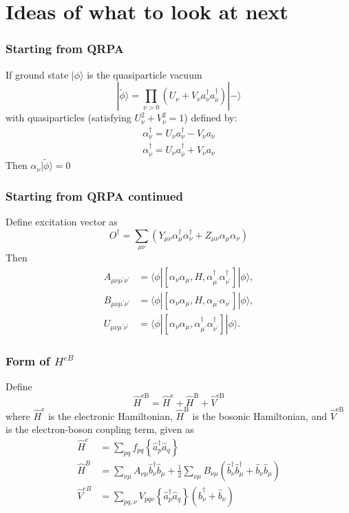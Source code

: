 \documentclass{beamer}
\begin{document}
\section{Ideas of what to look at next}
\begin{frame}
\frametitle{Starting from QRPA}
If ground state $|\phi\rangle$ is the quasiparticle vacuum 
\begin{equation}
|\tilde{\phi}\rangle=\prod_{\nu>0}\left(U_\nu+V_\nu a_\nu^{\dagger} a_{\overline{\nu}}^{\dagger}\right)|-\rangle
\end{equation}
with quasiparticles (satisfying $U_\nu^2+V_\nu^2=1$) defined by: 
\begin{align}
    \alpha_\nu^{\dagger}=U_\nu a_\nu^{\dagger}-V_\nu a_{\bar{\nu}} \\
    \alpha_{\bar{\nu}}^{\dagger}=U_\nu a_{\bar{\nu}}^{\dagger}+V_\nu a_\nu
\end{align}
Then $\alpha_\nu |\tilde{\phi}\rangle=0$ 

\end{frame}

\begin{frame}
\frametitle{Starting from QRPA continued}
Define excitation vector as
\begin{equation}
    O^{\dagger}=\sum_{\mu \nu}\left(Y_{\mu \nu} \alpha_\mu^{\dagger} \alpha_\nu^{\dagger}+Z_{\mu \nu} \alpha_\mu \alpha_\nu\right)
\end{equation}
Then
\begin{align}
    A_{\mu \nu \mu^{\prime} \nu^{\prime}} &= \langle\phi|\left[\alpha_\nu \alpha_\mu, H, \alpha_{\mu^{\prime}}^{\dagger} \alpha_{\nu^{\prime}}^{\dagger}\right]|\phi\rangle, \\
    B_{\mu \nu \mu^{\prime} \nu^{\prime}} &= \langle\phi|\left[\alpha_\nu \alpha_\mu, H, \alpha_{\mu^{\prime}} \alpha_{\nu^{\prime}}\right]|\phi\rangle, \\
    U_{\mu \nu \mu^{\prime} \nu^{\prime}} &= \langle\phi|\left[\alpha_\nu \alpha_\mu, \alpha_{\mu^{\prime}}^{\dagger} \alpha_{\nu^{\prime}}^{\dagger}\right]|\phi\rangle .
\end{align}
\end{frame}

\begin{frame}
\frametitle{Form of $H^{eB}$}
Define \begin{equation}
\hat{H}^{\mathrm{eB}}=\hat{H}^{\mathrm{e}}+\hat{H}^{\mathrm{B}}+\hat{V}^{\mathrm{eB}}
\end{equation}
where $\hat{H}^{\mathrm{e}}$ is the electronic Hamiltonian, $\hat{H}^{\mathrm{B}}$ is the bosonic Hamiltonian, and $\hat{V}^{\mathrm{eB}}$ is the electron-boson coupling term, given as
\begin{align}
\hat{H}^e&=\sum_{p q} f_{p q}\left\{\hat{a}_p^{\dagger} \hat{a}_q\right\} \\
\hat{H}^{B}&=\sum_{\nu \mu} A_{\nu \mu} \hat{b}_\nu^{\dagger} \hat{b}_\mu+\frac{1}{2} \sum_{\nu \mu} B_{\nu \mu}\left(\hat{b}_\nu^{\dagger} \hat{b}_\mu^{\dagger}+\hat{b}_\nu \hat{b}_\mu\right)
\label{b} \\
\hat{V}^{eB}&=\sum_{p q, \nu} V_{p q \nu}\left\{\hat{a}_p^{\dagger} \hat{a}_q\right\}\left(\hat{b}_\nu^{\dagger}+\hat{b}_\nu\right)
\label{eb}
\end{align}
\end{frame}
\end{document}
